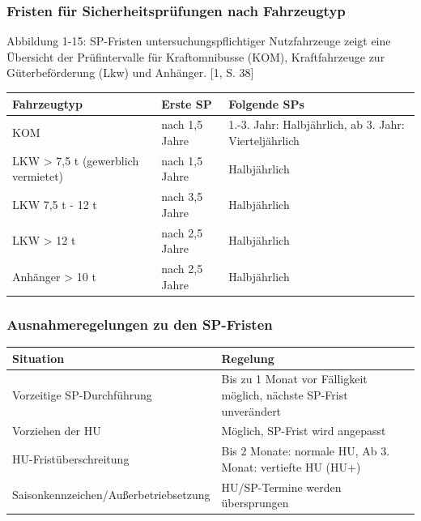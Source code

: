\documentclass{vorlage-design-main}
\begin{document}
\subsubsection{Fristen für Sicherheitsprüfungen nach
Fahrzeugtyp}\label{fristen-fuer-sicherheitspruefungen-nach-fahrzeugtyp}

Abbildung 1-15: SP-Fristen untersuchungspflichtiger Nutzfahrzeuge zeigt
eine Übersicht der Prüfintervalle für Kraftomnibusse (KOM),
Kraftfahrzeuge zur Güterbeförderung (Lkw) und Anhänger. {[}1, S. 38{]}

\begin{table}[ht]
  \begin{tabular}{@{}lll@{}}
\toprule
Fahrzeugtyp
 & 
Erste SP
 & 
Folgende SPs
 \\
\midrule[\heavyrulewidth]
KOM & nach 1,5 Jahre & 1.-3. Jahr: Halbjährlich, ab 3. Jahr:
Vierteljährlich \\
LKW \textgreater{} 7,5 t (gewerblich vermietet) & nach 1,5 Jahre &
Halbjährlich \\
LKW 7,5 t - 12 t & nach 3,5 Jahre & Halbjährlich \\
LKW \textgreater{} 12 t & nach 2,5 Jahre & Halbjährlich \\
Anhänger \textgreater{} 10 t & nach 2,5 Jahre & Halbjährlich \\
\bottomrule
\end{tabular}%
\end{table}

\subsubsection{Ausnahmeregelungen zu den
SP-Fristen}\label{ausnahmeregelungen-zu-den-sp-fristen}

\begin{table}[ht]
  \begin{tabular}{@{}ll@{}}
\toprule
Situation
 & 
Regelung
 \\
\midrule[\heavyrulewidth]
Vorzeitige SP-Durchführung & Bis zu 1 Monat vor Fälligkeit möglich,
nächste SP-Frist unverändert \\
Vorziehen der HU & Möglich, SP-Frist wird angepasst \\
HU-Fristüberschreitung & Bis 2 Monate: normale HU, Ab 3. Monat:
vertiefte HU (HU+) \\
Saisonkennzeichen/Außerbetriebsetzung & HU/SP-Termine werden
übersprungen \\
\bottomrule
\end{tabular}%
\end{table}
\end{document}
